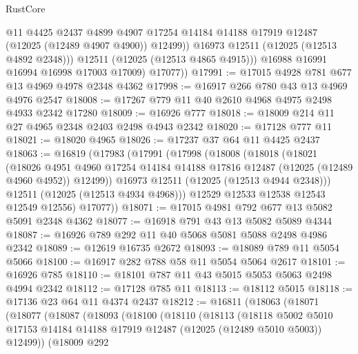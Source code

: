 \begin{lexlean}{RustCore}
\begin{coremodule}
                  @11
                  @4425
                  @2437
                  @4899
                  @4907
                  @17254
                  @14184
                  @14188
                  @17919
                  @12487
                  (@12025 (@12489 @4907 @4900))
                  @12499))
              @16973
              @12511
              (@12025 (@12513 @4892 @2348)))
            @12511
            (@12025 (@12513 @4865 @4915)))
          @16988
          @16991
          @16994
          @16998
          @17003
          @17009)
        @17077))
@17991 := @17015 @4928 @781 @677 @13 @4969 @4978 @2348 @4362
@17998 := @16917 @266 @780 @43 @13 @4969 @4976 @2547
@18008 := @17267 @779 @11 @40 @2610 @4968 @4975 @2498 @4933 @2342 @17280
@18009 := @16926 @777
@18018 := @18009 @214 @11 @27 @4965 @2348 @2403 @2498 @4943 @2342
@18020 := @17128 @777 @11
@18021 := @18020 @4965
@18026 := @17237 @37 @64 @11 @4425 @2437
@18063 := @16819
    (@17983
      (@17991
        (@17998
          (@18008
            (@18018
              (@18021
                (@18026
                  @4951
                  @4960
                  @17254
                  @14184
                  @14188
                  @17816
                  @12487
                  (@12025 (@12489 @4960 @4952))
                  @12499))
              @16973
              @12511
              (@12025 (@12513 @4944 @2348)))
            @12511
            (@12025 (@12513 @4934 @4968)))
          @12529
          @12533
          @12538
          @12543
          @12549
          @12556)
        @17077))
@18071 := @17015 @4981 @792 @677 @13 @5082 @5091 @2348 @4362
@18077 := @16918 @791 @43 @13 @5082 @5089 @4344
@18087 := @16926 @789 @292 @11 @40 @5068 @5081 @5088 @2498 @4986 @2342
@18089 := @12619 @16735 @2672
@18093 := @18089 @789 @11 @5054 @5066
@18100 := @16917 @282 @788 @58 @11 @5054 @5064 @2617
@18101 := @16926 @785
@18110 := @18101 @787 @11 @43 @5015 @5053 @5063 @2498 @4994 @2342
@18112 := @17128 @785 @11
@18113 := @18112 @5015
@18118 := @17136 @23 @64 @11 @4374 @2437
@18212 := @16811
    (@18063
      (@18071
        (@18077
          (@18087
            (@18093
              (@18100
                (@18110
                  (@18113
                    (@18118
                      @5002
                      @5010
                      @17153
                      @14184
                      @14188
                      @17919
                      @12487
                      (@12025 (@12489 @5010 @5003))
                      @12499))
                  (@18009
                    @292

\end{coremodule}
\end{lexlean}
